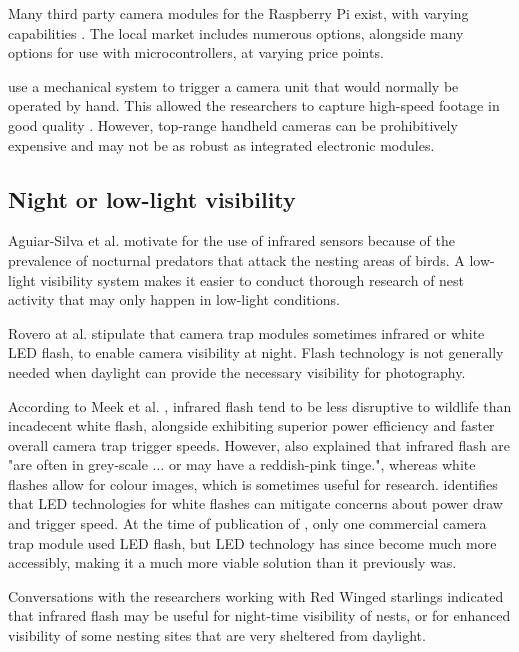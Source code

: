 \documentclass[class=report,11pt,crop=false]{standalone}
\begin{document}
Many third party camera modules for the Raspberry Pi exist, with varying capabilities \cite{jolles2021broad-scale}. The local market includes numerous options, alongside many options for use with microcontrollers, at varying price points.

\cite{rico-guevara2017bring} use a mechanical system to trigger a camera unit that would normally be operated by hand. This allowed the researchers to capture high-speed footage in good quality \cite{rico-guevara2017bring}. However, top-range handheld cameras can be prohibitively expensive and may not be as robust as integrated electronic modules.

\subsection{Night or low-light visibility}

Aguiar-Silva et al. \cite{aguiar-silva2017camera} motivate for the use of infrared sensors because of the prevalence of nocturnal predators that attack the nesting areas of birds. A low-light visibility system makes it easier to conduct thorough research of nest activity that may only happen in low-light conditions.

Rovero at al. \cite{rovero2013which} stipulate that camera trap modules sometimes infrared or white LED flash, to enable camera visibility at night. Flash technology is not generally needed when daylight can provide the necessary visibility for photography.

According to Meek et al. \cite{meek2012introduction}, infrared flash tend to be less disruptive to wildlife than incadecent white flash, alongside exhibiting superior power efficiency and faster overall camera trap trigger speeds. However, \cite{meek2012introduction} also explained that infrared flash are "are often in grey-scale ... or may have a
reddish-pink tinge.", whereas white flashes allow for colour images, which is sometimes useful for research. \cite{meek2012introduction} identifies that LED technologies for white flashes can mitigate concerns about power draw and trigger speed. At the time of publication of \cite{meek2012introduction}, only one commercial camera trap module used LED flash, but LED technology has since become much more accessibly, making it a much more viable solution than it previously was.

Conversations with the researchers working with Red Winged starlings \cite{hofmeyer2024private} indicated that infrared flash may be useful for night-time visibility of nests, or for enhanced visibility of some nesting sites that are very sheltered from daylight.
\end{document}
